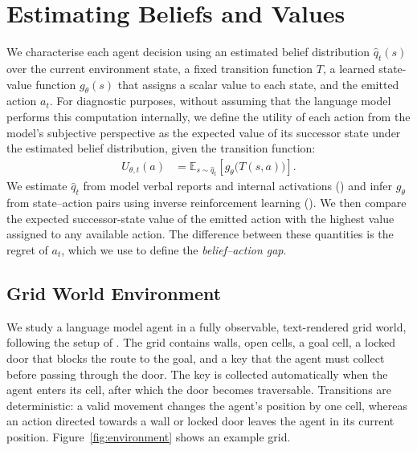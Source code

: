 \documentclass{article}
\begin{document}
\section{Estimating Beliefs and Values}
\label{sec:estimating}

We characterise each agent decision using an estimated belief distribution $\hat q_t(s)$ over the current environment state, a fixed transition function $T$, a learned state-value function $g_\theta(s)$ that assigns a scalar value to each state, and the emitted action $a_t$. 
For diagnostic purposes, without assuming that the language model performs this computation internally, we define the utility of each action from the model's subjective perspective as the expected value of its successor state under the estimated belief distribution, given the transition function:
\begin{align}
    U_{\theta,t}(a)
    &=
    \mathbb{E}_{s \sim \hat q_t}
    \left[g_\theta\bigl(T(s,a)\bigr)\right].
    \label{eq:expected-action-preference}
\end{align}
We estimate $\hat q_t$ from model verbal reports and internal activations () and infer $g_\theta$ from state--action pairs using inverse reinforcement learning (). 
We then compare the expected successor-state value of the emitted action with the highest value assigned to any available action. 
The difference between these quantities is the regret of $a_t$, which we use to define the \emph{belief--action gap}. 



\subsection{Grid World Environment}
\label{sec:env-data}

We study a language model agent in a fully observable, text-rendered grid world, following the setup of \citet{arghal2026behavioural}. 
The grid contains walls, open cells, a goal cell, a locked door that blocks the route to the goal, and a key that the agent must collect before passing through the door. 
The key is collected automatically when the agent enters its cell, after which the door becomes traversable. Transitions are deterministic: a valid movement changes the agent's position by one cell, whereas an action directed towards a wall or locked door leaves the agent in its current position.
Figure~\ref{fig:environment} shows an example grid.
\end{document}

